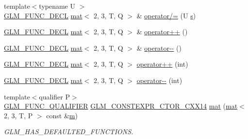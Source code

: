\begin{DoxyCompactItemize}
\item 
{\footnotesize template$<$typename U $>$ }\\\mbox{\hyperlink{setup_8hpp_ab2d052de21a70539923e9bcbf6e83a51}{G\+L\+M\+\_\+\+F\+U\+N\+C\+\_\+\+D\+E\+CL}} \mbox{\hyperlink{structglm_1_1mat}{mat}}$<$ 2, 3, T, Q $>$ \& \mbox{\hyperlink{structglm_1_1mat_3_012_00_013_00_01_t_00_01_q_01_4_ae42a9e4f6c5520b785825bb78e32ed23}{operator/=}} (U \mbox{\hyperlink{_s_d_l__opengl_8h_a4af680a6c683f88ed67b76f207f2e6e4}{s}})
\item 
\mbox{\hyperlink{setup_8hpp_ab2d052de21a70539923e9bcbf6e83a51}{G\+L\+M\+\_\+\+F\+U\+N\+C\+\_\+\+D\+E\+CL}} \mbox{\hyperlink{structglm_1_1mat}{mat}}$<$ 2, 3, T, Q $>$ \& \mbox{\hyperlink{structglm_1_1mat_3_012_00_013_00_01_t_00_01_q_01_4_adf02b075f2abd15cc118063f2fe285b5}{operator++}} ()
\item 
\mbox{\hyperlink{setup_8hpp_ab2d052de21a70539923e9bcbf6e83a51}{G\+L\+M\+\_\+\+F\+U\+N\+C\+\_\+\+D\+E\+CL}} \mbox{\hyperlink{structglm_1_1mat}{mat}}$<$ 2, 3, T, Q $>$ \& \mbox{\hyperlink{structglm_1_1mat_3_012_00_013_00_01_t_00_01_q_01_4_a828a596a4d82b6e970290f9c0449da87}{operator-\/-\/}} ()
\item 
\mbox{\hyperlink{setup_8hpp_ab2d052de21a70539923e9bcbf6e83a51}{G\+L\+M\+\_\+\+F\+U\+N\+C\+\_\+\+D\+E\+CL}} \mbox{\hyperlink{structglm_1_1mat}{mat}}$<$ 2, 3, T, Q $>$ \mbox{\hyperlink{structglm_1_1mat_3_012_00_013_00_01_t_00_01_q_01_4_aebb78fc2bc121d63a668f692874eacdf}{operator++}} (int)
\item 
\mbox{\hyperlink{setup_8hpp_ab2d052de21a70539923e9bcbf6e83a51}{G\+L\+M\+\_\+\+F\+U\+N\+C\+\_\+\+D\+E\+CL}} \mbox{\hyperlink{structglm_1_1mat}{mat}}$<$ 2, 3, T, Q $>$ \mbox{\hyperlink{structglm_1_1mat_3_012_00_013_00_01_t_00_01_q_01_4_ad500baad9a2da00e3f22e9776b9a3883}{operator-\/-\/}} (int)
\item 
{\footnotesize template$<$qualifier P$>$ }\\\mbox{\hyperlink{setup_8hpp_a33fdea6f91c5f834105f7415e2a64407}{G\+L\+M\+\_\+\+F\+U\+N\+C\+\_\+\+Q\+U\+A\+L\+I\+F\+I\+ER}} \mbox{\hyperlink{setup_8hpp_a0900f9145e68bf6061b6f5e7be3fa751}{G\+L\+M\+\_\+\+C\+O\+N\+S\+T\+E\+X\+P\+R\+\_\+\+C\+T\+O\+R\+\_\+\+C\+X\+X14}} \mbox{\hyperlink{structglm_1_1mat_3_012_00_013_00_01_t_00_01_q_01_4_a54292d5f34dca47737a3037100d133cb}{mat}} (\mbox{\hyperlink{structglm_1_1mat}{mat}}$<$ 2, 3, T, P $>$ const \&\mbox{\hyperlink{_s_d_l__opengl__glext_8h_af593500c283bf1a787a6f947f503a5c2}{m}})
\begin{DoxyCompactList}\small\item\em G\+L\+M\+\_\+\+H\+A\+S\+\_\+\+D\+E\+F\+A\+U\+L\+T\+E\+D\+\_\+\+F\+U\+N\+C\+T\+I\+O\+NS. \end{DoxyCompactList}\item 

\end{DoxyCompactItemize}
